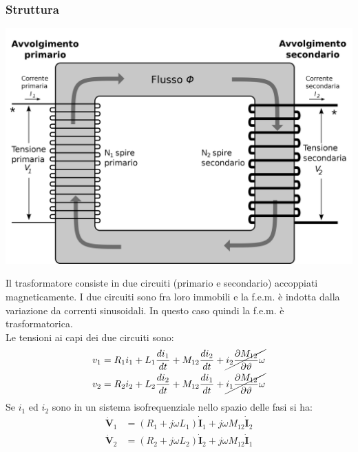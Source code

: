 \documentclass{article}
\begin{document}
\subsubsection{Struttura}
\begin{center}
    \includegraphics[scale=0.12]{Image/Trasformatore_2.png}
\end{center}
Il trasformatore consiste in due circuiti
(primario e secondario) accoppiati
magneticamente. I due circuiti sono fra
loro immobili e la f.e.m. è indotta dalla
variazione da correnti sinusoidali. In questo caso quindi la f.e.m. è trasformatorica.\\
Le tensioni ai capi dei due circuiti sono:
\begin{align*}
    v_1 &= R_1i_1+ L_1 \frac{di_1}{dt} + M_{12} \frac{di_2}{dt} + \cancel{i_2 \frac{\partial M_{12}}{\partial \vartheta}\omega}
    \\
    v_2 &= R_2i_2+ L_2 \frac{di_2}{dt} + M_{12} \frac{di_1}{dt} + \cancel{i_1 \frac{\partial M_{12}}{\partial \vartheta}\omega}
\end{align*}
Se $i_1$ ed $i_2$ sono in un sistema isofrequenziale nello spazio delle fasi si ha:
\begin{align*}
     \mathbf{\dot V}_1 &= (R_1+ j \omega L_1)  \mathbf{\dot I}_1 + j \omega M_{12}   \mathbf{\dot I}_2
     \\
     \mathbf{\dot V}_2 &= (R_2+ j \omega L_2)  \mathbf{\dot I}_2 + j \omega M_{12}   \mathbf{\dot I}_1
\end{align*}
\end{document}
